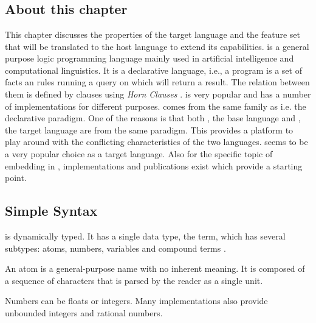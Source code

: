 \documentclass[thesis-solanki.tex]{subfiles}
\begin{document}
\chapter{}\label{chap:pwp}


\section{About this chapter}

This chapter discusses the properties of the target language  and the feature set that will be
translated to the host language to extend its capabilities.
 is a general purpose logic programming language mainly used in artificial intelligence and
computational linguistics.
It is a declarative language, i.e., a program is a set of facts an rules running a query on which will return a
result.
The relation between them is defined by clauses using \textit{Horn Clauses} \cite{wikiprolog}.
 is very popular and has a number of implementations
\cite{website:comparisonofprologimplementationswiki} for different purposes.
 comes from the same family as  i.e.
the declarative paradigm.
One of the reasons is that both , the base language and , the target language
are from the same paradigm.
This provides a platform to play around with the conflicting characteristics of the two languages.
 seems to be a very popular choice as a target language.
Also for the specific topic of embedding  in , implementations and publications
exist which provide a starting point.
  
\section{Simple Syntax}

 is dynamically typed.
It has a single data type, the term, which has several subtypes: atoms, numbers, variables and compound terms
\cite{wikiprolog}.


An atom is a general-purpose name with no inherent meaning.
It is composed of a sequence of characters that is parsed by the  reader as a single unit.

Numbers can be floats or integers.
Many  implementations also provide unbounded integers and rational numbers.
\end{document}
